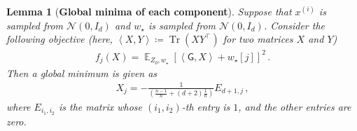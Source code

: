 \documentclass{article}
\DeclareMathOperator{\E}{\mathbb{E}}
\newtheorem{lemma}{Lemma}
\newcommand{\wstar}{w_\star}
\newcommand{\tx}[1]{x^{(#1)}}
\newcommand{\MM}{\mathsf{G}}
\DeclareMathOperator{\tr}{Tr}
\newcommand{\inp}[2]{\left \langle #1,#2\right\rangle}
\begin{document}
\begin{lemma}[\textbf{Global minima of each component}] \label{lem:component opt}
Suppose that $\tx{i}$ is sampled from $\mathcal{N}(0, I_d)$ and  $\wstar$ is sampled  from $\mathcal{N}(0, I_d)$.      Consider the following objective (here, $\inp{X}{Y} \coloneqq \tr(XY^\top)$ for two matrices $X$ and $Y$)
\begin{align}
f_j(X) =  \E_{Z_0,\wstar}\left[ \inp{\MM}{X}  + \wstar[j] \right]^2\,.
\end{align} 
Then a global minimum is given as 
\begin{align} \label{exp:opt_single}
X_j = - \frac{1}{\left( \frac{n-1}{n} +  (d+2) \frac{1}{n} \right)}E_{d+1,j}\,,
\end{align} where $E_{i_1,i_2}$ is the matrix whose $(i_1,i_2)$-th entry is $1$,  and the other entries are zero.
\end{lemma}
\end{document}
